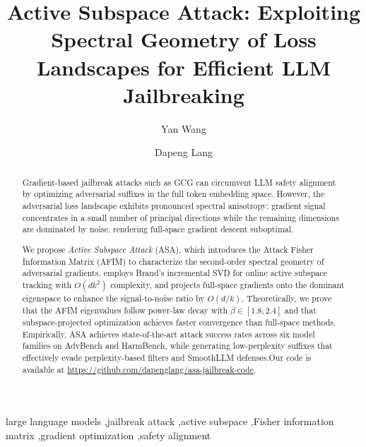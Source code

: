 \documentclass[preprint,12pt]{elsarticle}
\begin{document}
\graphicspath{{figures/}}

\begin{frontmatter}

\title{Active Subspace Attack: Exploiting Spectral Geometry of Loss Landscapes for Efficient LLM Jailbreaking}

\author[inst1]{Yan Wang}

\author[inst2,cor1]{Dapeng Lang}




\begin{abstract}

Gradient-based jailbreak attacks such as GCG can circumvent LLM safety alignment by optimizing adversarial suffixes in the full token embedding space. However, the adversarial loss landscape exhibits pronounced spectral anisotropy: gradient signal concentrates in a small number of principal directions while the remaining dimensions are dominated by noise, rendering full-space gradient descent suboptimal.

We propose \textit{Active Subspace Attack} (ASA), which introduces the Attack Fisher Information Matrix (AFIM) to characterize the second-order spectral geometry of adversarial gradients, employs Brand's incremental SVD for online active subspace tracking with $O(dk^2)$ complexity, and projects full-space gradients onto the dominant eigenspace to enhance the signal-to-noise ratio by $O(d/k)$. Theoretically, we prove that the AFIM eigenvalues follow power-law decay with $\beta \in [1.8, 2.4]$ and that subspace-projected optimization achieves faster convergence than full-space methods. Empirically, ASA achieves state-of-the-art attack success rates across six model families on AdvBench and HarmBench, while generating low-perplexity suffixes that effectively evade perplexity-based filters and SmoothLLM defenses.Our code is available at \url{https://github.com/dapenglang/asa-jailbreak-code}.

\end{abstract}



\begin{keywords}
large language models \sep jailbreak attack \sep active subspace \sep Fisher information matrix \sep gradient optimization \sep safety alignment
\end{keywords}

\end{frontmatter}
\end{document}
